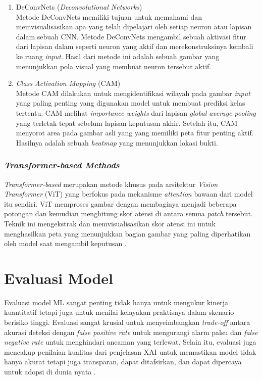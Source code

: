 \begin{enumerate}
	\item DeConvNets (\textit{Deconvolutional Networks})\\
	Metode DeConvNets memiliki tujuan untuk memahami dan memvisualisasikan apa yang telah dipelajari oleh setiap neuron atau lapisan dalam sebuah CNN. Metode DeConvNets mengambil sebuah aktivasi fitur dari lapisan dalam seperti neuron yang aktif dan merekonstruksinya kembali ke ruang \textit{input}. Hasil dari metode ini adalah sebuah gambar yang menunjukkan pola visual yang membuat neuron tersebut aktif.
	
	\item \textit{Class Activation Mapping} (CAM)\\
	Metode CAM dilakukan untuk mengidentifikasi wilayah pada gambar \textit{input} yang paling penting yang digunakan model untuk membuat prediksi kelas tertentu. CAM melihat \textit{importance weights} dari lapisan \textit{global average pooling} yang terletak tepat sebelum lapisan keputusan akhir. Setelah itu, CAM menyorot area pada gambar asli yang yang memiliki peta fitur penting aktif. Hasilnya adalah sebuah \textit{heatmap} yang menunjukkan lokasi bukti. 
	
\end{enumerate}

\subsubsection{\textit{Transformer-based Methods}}
\textit{Transformer-based} merupakan metode khusus pada arsitektur \textit{Vision Transformer} (ViT) yang berfokus pada mekanisme \textit{attention} bawaan dari model itu sendiri. ViT memproses gambar dengan membaginya menjadi beberapa potongan dan kemudian menghitung skor atensi di antara semua \textit{patch} tersebut. Teknik ini mengekstrak dan memvisualisasikan skor atensi ini untuk menghasilkan peta yang menunjukkan bagian gambar yang paling diperhatikan oleh model saat mengambil keputusan \autocite{iftikhar2025explainable}.

\section{Evaluasi Model}
Evaluasi model ML sangat penting tidak hanya untuk mengukur kinerja kuantitatif tetapi juga untuk menilai kelayakan praktisnya dalam skenario berisiko tinggi. Evaluasi sangat krusial untuk menyeimbangkan \textit{trade-off} antara akurasi deteksi dengan \textit{false positive rate} untuk mengurangi alarm palsu dan \textit{false negative rate} untuk menghindari ancaman yang terlewat. Selain itu, evaluasi juga mencakup penilaian kualitas dari penjelasan XAI untuk memastikan model tidak hanya akurat tetapi juga transparan, dapat ditafsirkan, dan dapat dipercaya untuk adopsi di dunia nyata \autocite{mohale2025evaluating}.


